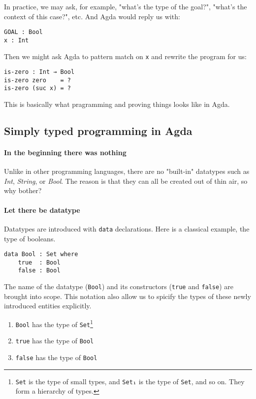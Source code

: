 \documentclass[12pt, a4paper]{article}
\begin{document}
In practice, we may ask, for example, "what's the type of the goal?",
 "what's the context of this case?", etc. And Agda would reply us with:

\begin{lstlisting}
GOAL : Bool
x : Int
\end{lstlisting}

Then we might ask Agda to pattern match on {\lstinline|x|} and rewrite the program for us:

\begin{lstlisting}
is-zero : Int → Bool
is-zero zero    = ?
is-zero (suc x) = ?
\end{lstlisting}

This is basically what pragramming and proving things looks like in Agda.

\subsection{Simply typed programming in Agda}

\paragraph{In the beginning there was nothing}
Unlike in other programming languages, there are no "built-in"
datatypes such as \textit{Int}, \textit{String}, or \textit{Bool}.
The reason is that they can all be created out of thin air, so why bother?

\paragraph{Let there be datatype}
Datatypes are introduced with {\lstinline|data|} declarations. Here is a classical example, the type of booleans.

\begin{lstlisting}
data Bool : Set where
    true  : Bool
    false : Bool
\end{lstlisting}

The name of the datatype ({\lstinline|Bool|}) and its constructors ({\lstinline|true|} and {\lstinline|false|}) are brought into scope.
This notation also allow us to spicify the types of these newly introduced entities explicitly.

\begin{enumerate}
    \item {\lstinline|Bool|} has the type of {\lstinline|Set|}\footnote{{\lstinline|Set|} is the type of small types, and {\lstinline|Set₁|} is the type
of {\lstinline|Set|}, and so on. They form a hierarchy of types.}
    \item {\lstinline|true|} has the type of {\lstinline|Bool|}
    \item {\lstinline|false|} has the type of {\lstinline|Bool|}
\end{enumerate}
\end{document}
